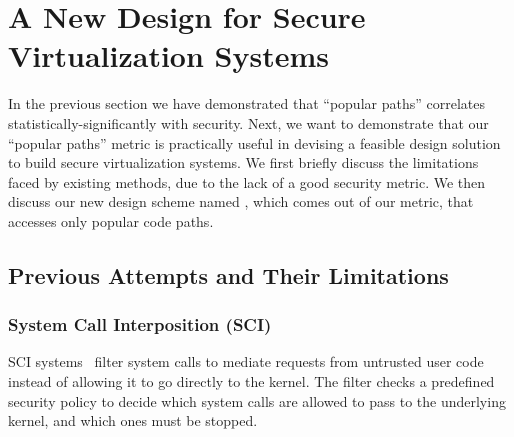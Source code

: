 \section{A New Design for Secure Virtualization Systems}
\label{sec.design}


In the previous section we have demonstrated that ``popular paths'' correlates statistically-significantly with security. 
Next, we want to demonstrate that our ``popular paths'' metric is practically useful in devising a feasible design solution to build 
secure virtualization systems. We first briefly discuss the limitations faced by existing methods, due to the lack of a good 
security metric. We then discuss our new design scheme named \lip, which comes out of our metric, that accesses only popular code paths. 

\subsection{Previous Attempts and Their Limitations}

\subsubsection{System Call Interposition (SCI)}
SCI systems~\cite{Janus0:96, Janus:99} filter system calls to mediate requests
from untrusted user code instead of allowing it to go directly to the kernel.
The filter checks a predefined security policy to decide which system calls are
allowed to pass to the underlying kernel, and which ones must be stopped.

